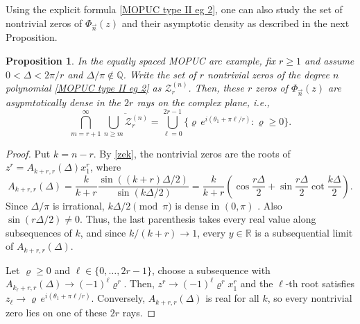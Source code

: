 \documentclass[a4paper,10pt,leqno]{amsart}
\numberwithin{equation}{section}
\newtheorem{proposition}[theorem]{Proposition}
\theoremstyle{remark}
\newcommand{\R}{\mathbb{R}}
\begin{document}
Using the explicit formula \eqref{MOPUC type II eg 2}, one can also study the set of nontrivial zeros of $\Phi_{\vec n}(z)$ and their asymptotic density as described in the next Proposition.

\begin{proposition}\label{thm:fixed-r-ray-density}
In the equally spaced MOPUC arc example, fix $r\ge 1$ and assume
$0<\Delta<2\pi/r$ and $\Delta/\pi\notin \mathbb Q$.
Write the set of $r$ nontrivial zeros of the degree $n$ polynomial \eqref{MOPUC type II eg 2} as $\mathcal Z^{(n)}_{r}$.
Then, these $r$ zeros of $\Phi_{\vec n}(z)$ are asypmtotically dense in the $2r$ rays on the complex plane, i.e.,
\[
\bigcap_{m=r+1}^{\infty} \overline{\bigcup_{n \geq m} \mathcal Z^{(n)}_{r}} = \bigcup_{\ell=0}^{2r-1}
  \{\varrho \, e^{i(\theta_1+\pi\ell/r)}:\varrho\ge 0\}.
\]

\end{proposition}

\begin{proof}
Put $k=n-r$. By \eqref{zek}, the nontrivial zeros are the roots of
$z^r=A_{k+r,r}(\Delta)x_1^r$, where
\[
  A_{k+r,r}(\Delta)
  =\frac{k}{k+r}\frac{\sin((k+r)\Delta/2)}{\sin(k\Delta/2)}
  =\frac{k}{k+r}\left(\cos\frac{r\Delta}{2}
    +\sin\frac{r\Delta}{2}\cot\frac{k\Delta}{2}\right).
\]
Since $\Delta/\pi$ is irrational, $k\Delta/2 \pmod {\pi}$ is dense in $(0,\pi)$ . Also
$\sin(r\Delta/2)\ne0$. Thus, the last parenthesis takes every real value
along subsequences of $k$, and since $k/(k+r)\to1$, every $y\in\R$ is a
subsequential limit of $A_{k+r,r}(\Delta)$.

Let $\varrho \ge 0$ and $\ell \in \{0, \ldots, 2r-1\}$, choose a subsequence with
$A_{k_\ell+r,r}(\Delta)\to(-1)^\ell\varrho^r$. 
Then, $z^r \to (-1)^\ell \varrho^r x_1^r$ and the $\ell$-th root satisfies $z_\ell \to \varrho \, e^{i(\theta_1 + \pi \ell/r)}$.
Conversely, $A_{k+r,r}(\Delta)$ is real for all $k$, so every nontrivial zero lies on one of these $2r$ rays.
\end{proof}
\end{document}
